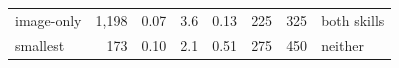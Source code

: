 \begin{tabular}{lrrrrrrl}
image-only & 1,198 & 0.07 & 3.6 & 0.13 & 225 & 325 & both skills \\
smallest & 173 & 0.10 & 2.1 & 0.51 & 275 & 450 & neither \\

\end{tabular}
